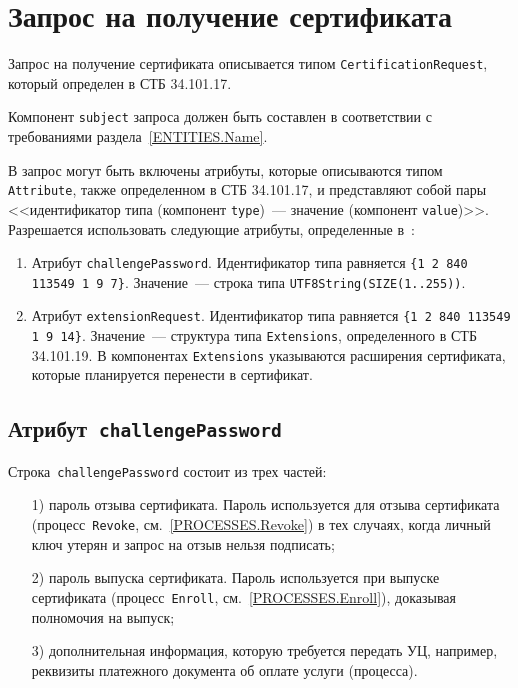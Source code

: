 \section{Запрос на получение сертификата}\label{FMT.CSR}

Запрос на получение сертификата описывается типом 
\texttt{CertificationRequest}, который определен в СТБ 34.101.17. 

Компонент \texttt{subject} запроса должен быть составлен в соответствии
с требованиями раздела~\ref{ENTITIES.Name}.

В запрос могут быть включены атрибуты, которые описываются типом 
\texttt{Attribute}, также определенном в СТБ 34.101.17,
и представляют собой пары <<идентификатор типа (компонент \texttt{type})~---
значение (компонент \texttt{value})>>. Разрешается использовать следующие 
атрибуты, определенные в~\cite{PKCS9}:
\begin{enumerate}
\item
Атрибут \texttt{challengePassword}.
Идентификатор типа равняется \verb|{1 2 840 113549 1 9 7}|.
Значение~--- строка типа \verb|UTF8String(SIZE(1..255))|.

\item
Атрибут \texttt{extensionRequest}.
Идентификатор типа равняется \verb|{1 2 840 113549 1 9 14}|.
Значение~--- структура типа \verb|Extensions|, определенного в СТБ 34.101.19.
В компонентах \verb|Extensions| указываются расширения сертификата,
которые планируется перенести в сертификат.
\end{enumerate}

\subsection{Атрибут~\texttt{challengePassword}}\label{FMT.CSR.CP}

Строка~\texttt{challengePassword} состоит из трех частей:
\begin{enumerate} 
\item[1)]
пароль отзыва сертификата. Пароль используется для отзыва сертификата
(процесс~\texttt{Revoke}, см.~\ref{PROCESSES.Revoke})
в тех случаях, когда личный ключ утерян и запрос на отзыв нельзя 
подписать;
\item[2)]
пароль выпуска сертификата. Пароль используется при выпуске сертификата
(процесс~\texttt{Enroll}, см.~\ref{PROCESSES.Enroll}),
доказывая полномочия на выпуск;
\item[3)]
дополнительная информация, которую требуется передать УЦ,
например, реквизиты платежного документа об оплате услуги (процесса).
\end{enumerate}

